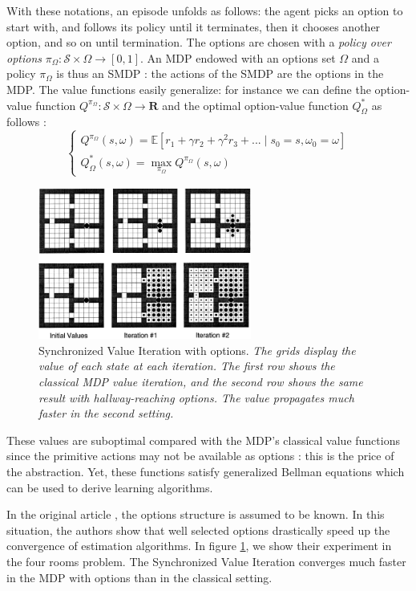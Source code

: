 \documentclass{article}
\newcommand{\Rr}{\mathbf{R}}
\newcommand{\Ee}{\mathbb{E}}
\begin{document}
With these notations, an episode unfolds as follows: the agent picks an option to start with, and follows its policy until it terminates, then it chooses another option, and so on until termination. The options are chosen with a \textit{policy over options} $\pi_\Omega : \mathcal{S} \times \Omega \rightarrow [0, 1]$. An MDP endowed with an options set $\Omega$ and a policy $\pi_\Omega$ is thus an SMDP : the actions of the SMDP are the options in the MDP.
The value functions easily generalize: for instance we can define the option-value function $Q^{\pi_\Omega} : \mathcal{S} \times \Omega \rightarrow \Rr$ and the optimal option-value function $Q^*_\Omega$ as follows :
\begin{equation}
\begin{cases}
Q^{\pi_\Omega}(s, \omega) = \Ee[r_1 + \gamma r_2 + \gamma^2 r_3 +  ... \mid s_0 = s, \omega_0 = \omega] \\
Q^*_\Omega(s, \omega) = \max_{\pi_\Omega} Q^{\pi_\Omega}(s, \omega)
\end{cases}
\end{equation}

\begin{figure}
    \centering
    \includegraphics[width=7cm]{images/SVI_options.png}
    \caption{Synchronized Value Iteration with options. \small \it The grids display the value of each state at each iteration. The first row shows the classical MDP value iteration, and the second row shows the same result with hallway-reaching options. The value propagates much faster in the second setting.}
    \label{fig:svi}
\end{figure}

These values are suboptimal compared with the MDP's classical value functions since the primitive actions may not be available as options : this is the price of the abstraction. Yet, these functions satisfy generalized Bellman equations which can be used to derive learning algorithms.

In the original article \cite{sutton_between_1999}, the options structure is assumed to be known. In this situation, the authors show that well selected options drastically speed up the convergence of estimation algorithms. In figure \ref{fig:svi}, we show their experiment in the four rooms problem. The Synchronized Value Iteration converges much faster in the MDP with options than in the classical setting.
\end{document}
